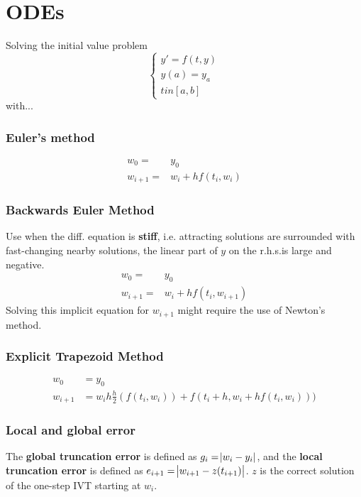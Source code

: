 \section{ODEs}
Solving the initial value problem
$$
\begin{cases}
y' = f(t,y) \\
y(a) = y_a \\
t in [a,b]
\end{cases}
$$
with...
\subsubsection{Euler's method}
\begin{align*}
w_0 = & y_0 \\
w_{i+1} = & w_{i} + h f(t_i, w_i)
\end{align*}

\subsubsection{Backwards Euler Method}
Use when the diff. equation is \textbf{stiff}, i.e. attracting solutions are surrounded with fast-changing nearby solutions, the linear part of $y$ on the r.h.s.is large and negative.
\begin{align*}
w_0 = &y_0 \\
w_{i+1} = & w_{i} + h f(t_i, w_{i+1})
\end{align*}
Solving this implicit equation for $w_{i+1}$ might require the use of Newton's method.
 
\subsubsection{Explicit Trapezoid Method}
\begin{align*}
w_0 &= y_0 \\
w_{i+1} &= w_i h \frac{h}{2}(f(t_i,w_i)) + f(t_i + h, w_i + hf(t_i,w_i)))
\end{align*}

\subsubsection{Local and global error}
\begin{definition}
The \textbf{global truncation error} is defined as $g_i = \abs{w_i-y_i}$, and the \textbf{local truncation error} is defined as $e_{i+1} = \abs{w_{i+1} - z(t_{i+1})}$. $z$ is the correct solution of the one-step IVT starting at $w_i$.
\end{definition}

